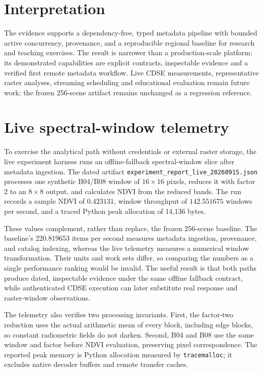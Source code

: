 \section{Interpretation}

The evidence supports a dependency-free, typed metadata pipeline with bounded active concurrency,
provenance, and a reproducible regional baseline for research and teaching exercises. The result
is narrower than a production-scale platform: its demonstrated capabilities are explicit
contracts, inspectable evidence and a verified first remote metadata workflow. Live CDSE
measurements, representative raster analyses, streaming scheduling and educational evaluation
remain future work; the frozen 256-scene artifact remains unchanged as a regression reference.

\section{Live spectral-window telemetry}

To exercise the analytical path without credentials or external raster storage, the live
experiment harness runs an offline-fallback spectral-window slice after metadata ingestion. The
dated artifact \texttt{experiment\_report\_live\_20260915.json} processes one synthetic B04/B08
window of \(16\times16\) pixels, reduces it with factor \(2\) to an \(8\times8\) output, and
calculates NDVI from the reduced bands. The run records a sample NDVI of \(0.423131\), window
throughput of \(142.551675\) windows per second, and a traced Python peak allocation of 14,136
bytes.

These values complement, rather than replace, the frozen 256-scene baseline. The baseline's
220.819653 items per second measures metadata ingestion, provenance, and catalog indexing,
whereas the live telemetry measures a numerical window transformation. Their units and work
sets differ, so comparing the numbers as a single performance ranking would be invalid. The
useful result is that both paths produce dated, inspectable evidence under the same offline
fallback contract, while authenticated CDSE execution can later substitute real response and
raster-window observations.

The telemetry also verifies two processing invariants. First, the factor-two reduction uses the
actual arithmetic mean of every block, including edge blocks, so constant radiometric fields do
not darken. Second, B04 and B08 use the same window and factor before NDVI evaluation, preserving
pixel correspondence. The reported peak memory is Python allocation measured by
\texttt{tracemalloc}; it excludes native decoder buffers and remote transfer caches.
